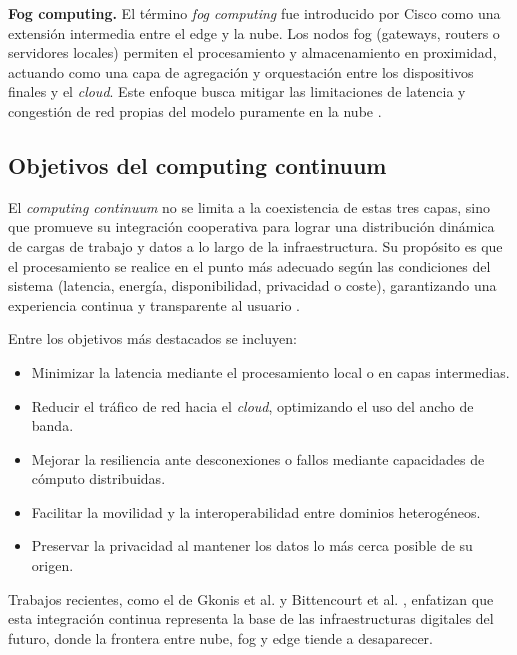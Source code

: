 \documentclass{report}
\begin{document}
\textbf{Fog computing.}  
El término \textit{fog computing} fue introducido por Cisco como una extensión intermedia entre el edge y la nube. Los nodos fog (gateways, routers o servidores locales) permiten el procesamiento y almacenamiento en proximidad, actuando como una capa de agregación y orquestación entre los dispositivos finales y el \textit{cloud}. Este enfoque busca mitigar las limitaciones de latencia y congestión de red propias del modelo puramente en la nube \cite{mouradian2017comprehensive,naha2018fog}.

\subsection{Objetivos del computing continuum}

El \textit{computing continuum} no se limita a la coexistencia de estas tres capas, sino que promueve su integración cooperativa para lograr una distribución dinámica de cargas de trabajo y datos a lo largo de la infraestructura. Su propósito es que el procesamiento se realice en el punto más adecuado según las condiciones del sistema (latencia, energía, disponibilidad, privacidad o coste), garantizando una experiencia continua y transparente al usuario \cite{gkonis2023survey,bittencourt2025continuum}.  

Entre los objetivos más destacados se incluyen:
\begin{itemize}
    \item Minimizar la latencia mediante el procesamiento local o en capas intermedias.
    \item Reducir el tráfico de red hacia el \textit{cloud}, optimizando el uso del ancho de banda.
    \item Mejorar la resiliencia ante desconexiones o fallos mediante capacidades de cómputo distribuidas.
    \item Facilitar la movilidad y la interoperabilidad entre dominios heterogéneos.
    \item Preservar la privacidad al mantener los datos lo más cerca posible de su origen.
\end{itemize}

Trabajos recientes, como el de Gkonis et al. \cite{gkonis2023survey} y Bittencourt et al. \cite{bittencourt2025continuum}, enfatizan que esta integración continua representa la base de las infraestructuras digitales del futuro, donde la frontera entre nube, fog y edge tiende a desaparecer.
\end{document}
